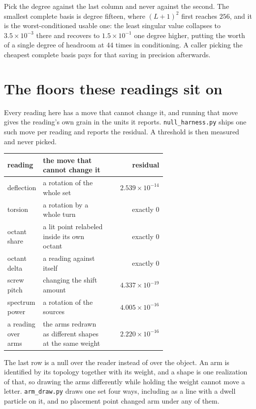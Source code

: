 Pick the degree against the last column and never against the second. The smallest complete basis is degree fifteen, where \((L+1)^2\) first reaches \(256\), and it is the worst-conditioned usable one: the least singular value collapses to \(3.5 \times 10^{-3}\) there and recovers to \(1.5 \times 10^{-1}\) one degree higher, putting the worth of a single degree of headroom at \(44\) times in conditioning. A caller picking the cheapest complete basis pays for that saving in precision afterwards.

\section{The floors these readings sit on}

Every reading here has a move that cannot change it, and running that move gives the reading's own grain in the units it reports. \texttt{null\_harness.py} ships one such move per reading and reports the residual. A threshold is then measured and never picked.

\begin{center}
\begin{tabular}{@{}p{0.22\linewidth}p{0.42\linewidth}r@{}}
\toprule
reading & the move that cannot change it & residual \\
\midrule
deflection & a rotation of the whole set & \(2.539 \times 10^{-14}\) \\
torsion & a rotation by a whole turn & exactly 0 \\
octant share & a lit point relabeled inside its own octant & exactly 0 \\
octant delta & a reading against itself & exactly 0 \\
screw pitch & changing the shift amount & \(4.337 \times 10^{-19}\) \\
spectrum power & a rotation of the sources & \(4.005 \times 10^{-16}\) \\
a reading over arms & the arms redrawn as different shapes at the same weight & \(2.220 \times 10^{-16}\) \\
\bottomrule
\end{tabular}
\end{center}

The last row is a null over the reader instead of over the object. An arm is identified by its topology together with its weight, and a shape is one realization of that, so drawing the arms differently while holding the weight cannot move a letter. \texttt{arm\_draw.py} draws one set four ways, including as a line with a dwell particle on it, and no placement point changed arm under any of them.

